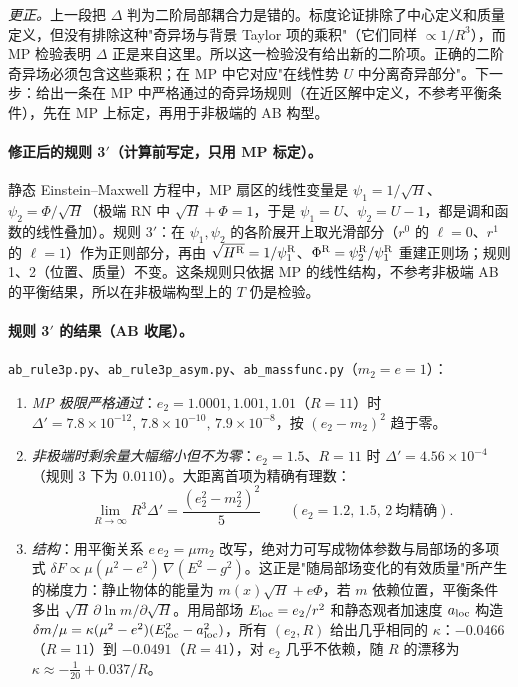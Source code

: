 \documentclass[11pt,a4paper]{ctexart}
\numberwithin{equation}{section}
\begin{document}
\emph{更正。}上一段把 $\Delta$ 判为二阶局部耦合力是错的。标度论证排除了中心定义和质量定义，但没有排除这种"奇异场与背景 Taylor 项的乘积"（它们同样 $\propto1/R^3$），而 MP 检验表明 $\Delta$ 正是来自这里。所以这一检验没有给出新的二阶项。正确的二阶奇异场必须包含这些乘积；在 MP 中它对应"在线性势 $U$ 中分离奇异部分"。下一步：给出一条在 MP 中严格通过的奇异场规则（在近区解中定义，不参考平衡条件），先在 MP 上标定，再用于非极端的 AB 构型。

\paragraph{修正后的规则 3$'$（计算前写定，只用 MP 标定）。}静态 Einstein--Maxwell 方程中，MP 扇区的线性变量是 $\psi_1=1/\sqrt H$、$\psi_2=\Phi/\sqrt H$（极端 RN 中 $\sqrt H+\Phi=1$，于是 $\psi_1=U$、$\psi_2=U-1$，都是调和函数的线性叠加）。规则 3$'$：在 $\psi_1,\psi_2$ 的各阶展开上取光滑部分（$r^0$ 的 $\ell=0$、$r^1$ 的 $\ell=1$）作为正则部分，再由 $\sqrt{H^{\rm R}}=1/\psi_1^{\rm R}$、$\Phi^{\rm R}=\psi_2^{\rm R}/\psi_1^{\rm R}$ 重建正则场；规则 1、2（位置、质量）不变。这条规则只依据 MP 的线性结构，不参考非极端 AB 的平衡结果，所以在非极端构型上的 $T$ 仍是检验。

\paragraph{规则 3$'$ 的结果（AB 收尾）。}\texttt{ab\_rule3p.py}、\texttt{ab\_rule3p\_asym.py}、\texttt{ab\_massfunc.py}（$m_2=e=1$）：
\begin{enumerate}
\item \emph{MP 极限严格通过}：$e_2=1.0001,1.001,1.01$（$R=11$）时 $\Delta'=7.8\times10^{-12},\,7.8\times10^{-10},\,7.9\times10^{-8}$，按 $(e_2-m_2)^2$ 趋于零。
\item \emph{非极端时剩余量大幅缩小但不为零}：$e_2=1.5$、$R=11$ 时 $\Delta'=4.56\times10^{-4}$（规则 3 下为 $0.0110$）。大距离首项为精确有理数：
\begin{equation*}
\lim_{R\to\infty}R^3\Delta'=\frac{(e_2^2-m_2^2)^2}{5}\qquad(e_2=1.2,\,1.5,\,2\ \text{均精确}).
\end{equation*}
\item \emph{结构}：用平衡关系 $e\,e_2=\mu m_2$ 改写，绝对力可写成物体参数与局部场的多项式 $\delta F\propto\mu(\mu^2-e^2)\,\nabla(E^2-g^2)$。这正是"随局部场变化的有效质量"所产生的梯度力：静止物体的能量为 $m(x)\sqrt H+e\Phi$，若 $m$ 依赖位置，平衡条件多出 $\sqrt H\,\partial\ln m/\partial\sqrt H$。用局部场 $E_{\rm loc}=e_2/r^2$ 和静态观者加速度 $a_{\rm loc}$ 构造 $\delta m/\mu=\kappa(\mu^2-e^2)(E_{\rm loc}^2-a_{\rm loc}^2)$，所有 $(e_2,R)$ 给出几乎相同的 $\kappa$：$-0.0466$（$R=11$）到 $-0.0491$（$R=41$），对 $e_2$ 几乎不依赖，随 $R$ 的漂移为 $\kappa\approx-\tfrac1{20}+0.037/R$。
\end{enumerate}
\end{document}
